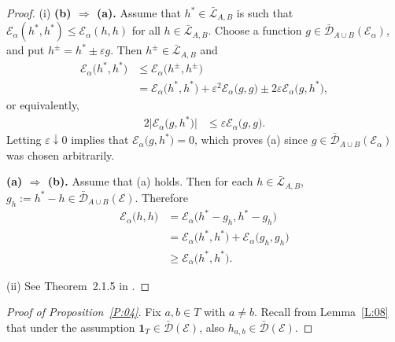 \documentclass[11pt]{amsart}
\numberwithin{equation}{section}
\begin{document}
{\begin{proof}  (i) {\bf (b) $\Longrightarrow$ (a).}
 Assume that $h^\ast\in\bar{\mathcal L}_{A,B}$ is such that ${\mathcal E}_\alpha(h^\ast,h^\ast)\le{\mathcal E}_\alpha(h,h)$ for all $h\in\bar{\mathcal L}_{A,B}$.  Choose a function  $g\in\bar{\mathcal D}_{A\cup B}({\mathcal E}_\alpha)$, and put $h^{\pm}=h^\ast\pm\varepsilon g$. Then $h^\pm\in\bar{\mathcal L}_{A,B}$ and
\begin{equation}
\begin{aligned}
   {\mathcal E}_\alpha\big(h^\ast,h^\ast\big)
 &\le
   {\mathcal E}_\alpha\big(h^{\pm},h^{\pm}\big)
  \\
 &=
   {\mathcal E}_\alpha\big(h^\ast,h^\ast\big)+\varepsilon^2{\mathcal E}_\alpha\big(g,g\big)\pm 2\varepsilon {\mathcal E}_\alpha\big(g,h^\ast\big),
\end{aligned}
\end{equation}
or equivalently,
\begin{equation}\label{emin3}
\begin{aligned}
   2\big|{\mathcal E}_\alpha\big(g,h^\ast\big)\big|
 &\le
   \varepsilon{\mathcal E}_\alpha\big(g,g\big).
\end{aligned}
\end{equation}
Letting $\varepsilon\downarrow 0$ implies that ${\mathcal E}_\alpha\big(g,h^\ast\big)=0$, which proves (a) since
$g\in\bar{\mathcal D}_{A\cup B}({\mathcal E}_\alpha)$ was chosen arbitrarily.
{\smallskip}

{\bf (a) $\Longrightarrow$ (b).} Assume that (a) holds. Then for each $h\in\bar{\mathcal L}_{A,B}$,
$g_{h}:=h^\ast-h\in\bar{\mathcal D}_{A\cup B}({\mathcal E})$. Therefore
\begin{equation}\label{emin}
\begin{aligned}
   {\mathcal E}_\alpha\big(h,h\big)
 &=
   {\mathcal E}_\alpha\big(h^\ast-g_h,h^\ast-g_h\big)
  \\
 &=
   {\mathcal E}_\alpha\big(h^\ast,h^\ast\big)+{\mathcal E}_\alpha\big(g_h,g_h\big)
  \\
 &\ge
    {\mathcal E}_\alpha\big(h^\ast,h^\ast\big).
\end{aligned}
\end{equation}{\smallskip}

 (ii) See Theorem~2.1.5 in \cite{FukushimaOshimaTakeda1994}.
\end{proof}{\smallskip}

\begin{proof}[Proof of Proposition~\ref{P:04}] Fix $a,b\in T$ with $a\not=b$. Recall from Lemma~\ref{L:08} that under the assumption $\mathbf{1}_T\in \bar{\mathcal D}({\mathcal E})$, also
$h_{{a},{b}}\in \bar{\mathcal D}({\mathcal E})$.


\end{proof}}
\end{document}
